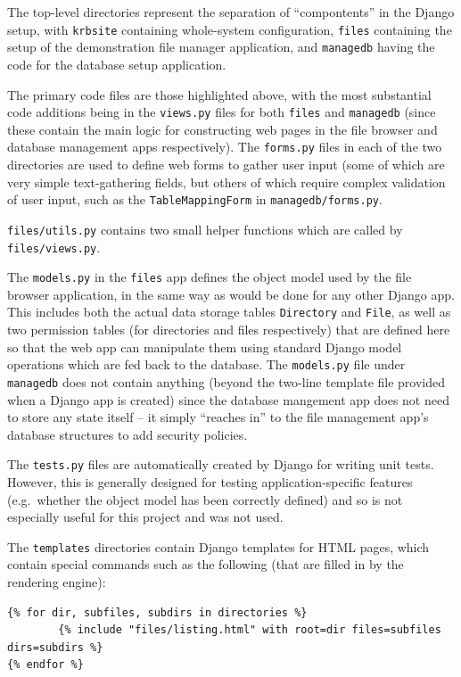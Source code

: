 \documentclass{report}
\begin{document}
The top-level directories represent the separation of ``compontents'' in the Django setup, with \texttt{krbsite} containing whole-system configuration, \texttt{files} containing the setup of the demonstration file manager application, and \texttt{managedb} having the code for the database setup application.

The primary code files are those highlighted above, with the most substantial code additions being in the \texttt{views.py} files for both \texttt{files} and \texttt{managedb} (since these contain the main logic for constructing web pages in the file browser and database management apps respectively). The \texttt{forms.py} files in each of the two directories are used to define web forms to gather user input (some of which are very simple text-gathering fields, but others of which require complex validation of user input, such as the \texttt{TableMappingForm} in \texttt{managedb/forms.py}.

\texttt{files/utils.py} contains two small helper functions which are called by \texttt{files/views.py}.

The \texttt{models.py} in the \texttt{files} app defines the object model used by the file browser application, in the same way as would be done for any other Django app. This includes both the actual data storage tables \texttt{Directory} and \texttt{File}, as well as two permission tables (for directories and files respectively) that are defined here so that the web app can manipulate them using standard Django model operations which are fed back to the database. The \texttt{models.py} file under \texttt{managedb} does not contain anything (beyond the two-line template file provided when a Django app is created) since the database mangement app does not need to store any state itself -- it simply ``reaches in'' to the file management app's database structures to add security policies.

The \texttt{tests.py} files are automatically created by Django for writing unit tests. However, this is generally designed for testing application-specific features (e.g.\ whether the object model has been correctly defined) and so is not especially useful for this project and was not used.

The \texttt{templates} directories contain Django templates for HTML pages, which contain special commands such as the following (that are filled in by the rendering engine):

\begin{verbatim}
{% for dir, subfiles, subdirs in directories %}
        {% include "files/listing.html" with root=dir files=subfiles dirs=subdirs %}
{% endfor %}
\end{verbatim}
\end{document}
